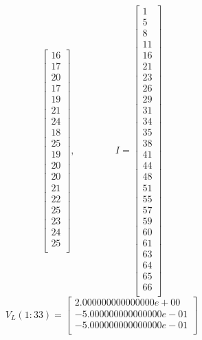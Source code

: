 \documentclass[12pt]{article}
\begin{document}
\begin{itemize}
\begin{small}
$$\begin{bmatrix}
    16\\
    17\\
    20\\
    17\\
    19\\
    21\\
    24\\
    18\\
    25\\
    19\\
    20\\
    20\\
    21\\
    22\\
    25\\
    23\\
    24\\
    25\\
\end{bmatrix},\hspace{50pt}
I=\begin{bmatrix}
	 1\\
     5\\
     8\\
    11\\
    16\\
    21\\
    23\\
    26\\
    29\\
    31\\
    34\\
    35\\
    38\\
    41\\
    44\\
    48\\
    51\\
    55\\
    57\\
    59\\
    60\\
    61\\
    63\\
    64\\
    65\\
    66\\
\end{bmatrix}$$
$$V_L(1:33)=\begin{bmatrix}
     2.000000000000000e+00\\
    -5.000000000000000e-01\\
    -5.000000000000000e-01\\

\end{bmatrix}$$
\end{small}
\end{itemize}
\end{document}
